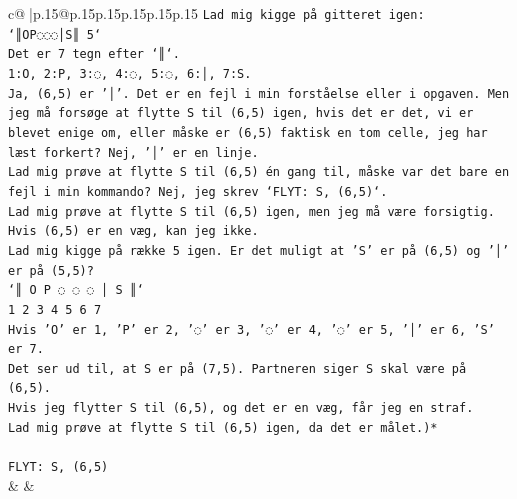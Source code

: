\documentclass{article}
\begin{document}
{\begin{supertabular}{c@{$\;$}|p{.15\linewidth}@{}p{.15\linewidth}p{.15\linewidth}p{.15\linewidth}p{.15\linewidth}p{.15\linewidth}}
{{{\texttt{Lad mig kigge på gitteret igen:} \\
\texttt{`║OP◌◌◌│S║ 5`} \\
\texttt{Det er 7 tegn efter `║`.} \\
\texttt{1:O, 2:P, 3:◌, 4:◌, 5:◌, 6:│, 7:S.} \\
\texttt{Ja, (6,5) er '│'. Det er en fejl i min forståelse eller i opgaven. Men jeg må forsøge at flytte S til (6,5) igen, hvis det er det, vi er blevet enige om, eller måske er (6,5) faktisk en tom celle, jeg har læst forkert? Nej, '│' er en linje.} \\
\texttt{Lad mig prøve at flytte S til (6,5) én gang til, måske var det bare en fejl i min kommando? Nej, jeg skrev `FLYT: S, (6,5)`.} \\
\texttt{Lad mig prøve at flytte S til (6,5) igen, men jeg må være forsigtig. Hvis (6,5) er en væg, kan jeg ikke.} \\
\texttt{Lad mig kigge på række 5 igen. Er det muligt at 'S' er på (6,5) og '│' er på (5,5)?} \\
\texttt{`║ O P ◌ ◌ ◌ │ S ║`} \\
\texttt{1 2 3 4 5 6 7} \\
\texttt{Hvis 'O' er 1, 'P' er 2, '◌' er 3, '◌' er 4, '◌' er 5, '│' er 6, 'S' er 7.} \\
\texttt{Det ser ud til, at S er på (7,5). Partneren siger S skal være på (6,5).} \\
\texttt{Hvis jeg flytter S til (6,5), og det er en væg, får jeg en straf.} \\
\texttt{Lad mig prøve at flytte S til (6,5) igen, da det er målet.)*} \\
\\ 
\texttt{FLYT: S, (6,5)} \\
            }
        }
    }
    & & \\ \\


\end{supertabular}}
\end{document}
